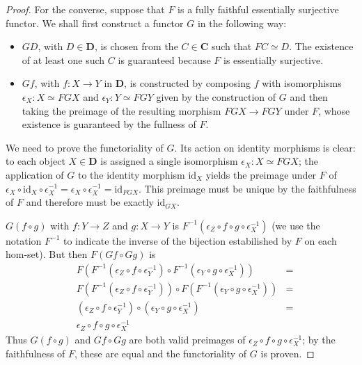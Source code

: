 \documentclass[a5paper,oneside,11pt]{article}
\newcommand\id{\mathord{\mathrm{id}}}
\newcommand\1{\mathord{\mathrm{1}}}
\newcommand\cat[1]{\mathbf{#1}}
\begin{document}
\begin{proof}
    For the converse, suppose that $F$ is a fully faithful essentially surjective functor.
    We shall first construct a functor $G$ in the following way:
    \begin{itemize}
        \item $GD$, with $D \in \cat{D}$, is chosen from the $C \in \cat{C}$ such that
            $FC \simeq D$.
            The existence of at least one such $C$ is guaranteed because $F$ is essentially
            surjective.
        \item $Gf$, with $f : X \rightarrow Y$ in $\cat{D}$, is constructed by composing $f$ with
            isomorphisms $\epsilon_X : X \simeq FGX$ and $\epsilon_Y : Y \simeq FGY$ given by the
            construction of $G$ and then taking the preimage of the resulting morphism
            $FGX \rightarrow FGY$ under $F$, whose existence is guaranteed by the fullness of $F$.
    \end{itemize}
    We need to prove the functoriality of $G$.
    Its action on identity morphisms is clear: to each object $X \in \cat{D}$ is assigned a single
    isomorphism $\epsilon_X : X \simeq FGX$; the application of $G$ to the identity morphism $\id_X$
    yields the preimage under $F$ of
    $\epsilon_X \circ \id_X \circ \epsilon_X^{-1} = \epsilon_X \circ \epsilon_X^{-1} = \id_{FGX}$.
    This preimage must be unique by the faithfulness of $F$ and therefore must be exactly $\id_{GX}$.

    $G(f \circ g)$ with $f : Y \rightarrow Z$ and
    $g : X \rightarrow Y$ is $F^{-1}(\epsilon_Z \circ f \circ g \circ \epsilon_X^{-1})$ (we use
    the notation $F^{-1}$ to indicate the inverse of the bijection estabilished by $F$ on each
    hom-set).
    But then $F(Gf \circ Gg)$ is
    \begin{align*}
        & F(F^{-1}(\epsilon_Z \circ f \circ \epsilon_Y^{-1}) \circ
        F^{-1}(\epsilon_Y \circ g \circ \epsilon_X^{-1})) & = \\
        & F(F^{-1}(\epsilon_Z \circ f \circ \epsilon_Y^{-1})) \circ
        F(F^{-1}(\epsilon_Y \circ g \circ \epsilon_X^{-1})) & = \\
        & (\epsilon_Z \circ f \circ \epsilon_Y^{-1}) \circ (\epsilon_Y \circ g \circ \epsilon_X^{-1}) & = \\
        & \epsilon_Z \circ f \circ g \circ \epsilon_X^{-1} &
    \end{align*}
    Thus $G(f \circ g)$ and $Gf \circ Gg$ are both valid preimages of
    $\epsilon_Z \circ f \circ g \circ \epsilon_X^{-1}$; by the faithfulness of $F$, these are equal
    and the functoriality of $G$ is proven.


\end{proof}
\end{document}
